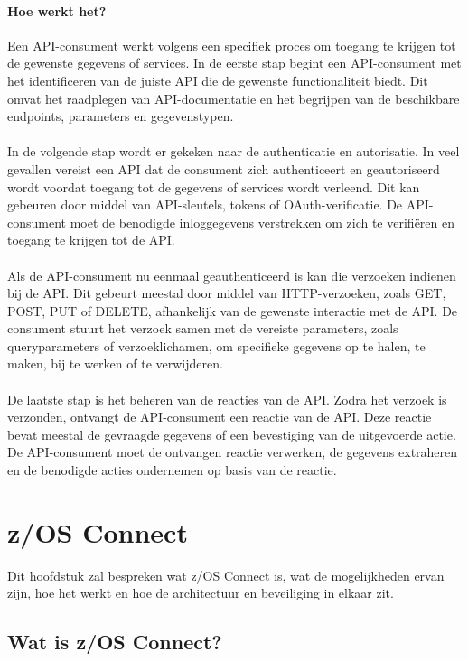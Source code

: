 \paragraph{Hoe werkt het?}
Een API-consument werkt volgens een specifiek proces om toegang te krijgen tot de gewenste gegevens of services.
In de eerste stap begint een API-consument met het identificeren van de juiste API die de gewenste functionaliteit biedt. Dit omvat het raadplegen van API-documentatie en het begrijpen van de beschikbare endpoints, parameters en gegevenstypen. \autocite{Cleo2023}
\\ \\
In de volgende stap wordt er gekeken naar de authenticatie en autorisatie. In veel gevallen vereist een API dat de consument zich authenticeert en geautoriseerd wordt voordat toegang tot de gegevens of services wordt verleend. Dit kan gebeuren door middel van API-sleutels, tokens of OAuth-verificatie. De API-consument moet de benodigde inloggegevens verstrekken om zich te verifiëren en toegang te krijgen tot de API. \autocite{Cleo2023}
\\ \\
Als de API-consument nu eenmaal geauthenticeerd is kan die verzoeken indienen bij de API. Dit gebeurt meestal door middel van HTTP-verzoeken, zoals GET, POST, PUT of DELETE, afhankelijk van de gewenste interactie met de API. De consument stuurt het verzoek samen met de vereiste parameters, zoals queryparameters of verzoeklichamen, om specifieke gegevens op te halen, te maken, bij te werken of te verwijderen. \autocite{Cleo2023}
\\ \\
De laatste stap is het beheren van de reacties van de API. Zodra het verzoek is verzonden, ontvangt de API-consument een reactie van de API. Deze reactie bevat meestal de gevraagde gegevens of een bevestiging van de uitgevoerde actie. De API-consument moet de ontvangen reactie verwerken, de gegevens extraheren en de benodigde acties ondernemen op basis van de reactie. \autocite{Cleo2023}
\\
\section{z/OS Connect}%
\label{sec:z/OS Connect}
Dit hoofdstuk zal bespreken wat z/OS Connect is, wat de mogelijkheden ervan zijn, hoe het werkt en hoe de architectuur en beveiliging in elkaar zit.

\subsection{Wat is z/OS Connect?}
\label{sec:Wat is z/OS Connect?}

